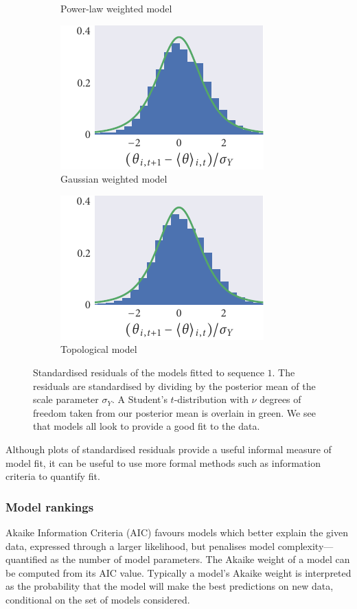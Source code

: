 \begin{figure}[tbb]
\begin{subfigure}[t]{0.33333\textwidth}
    \caption{Power-law weighted model}
  \end{subfigure}%
  \begin{subfigure}[t]{0.33333\textwidth}
    \includegraphics{seq1/gauss_residuals.pdf}
    \caption{Gaussian weighted model}
  \end{subfigure}%
  \begin{subfigure}[t]{0.33333\textwidth}
    \includegraphics{seq1/top_residuals.pdf}
    \caption{Topological model}
  \end{subfigure}
  \caption{Standardised residuals of the models fitted to sequence $1$. The
  residuals are standardised by dividing by the posterior mean of the scale
  parameter $\sigma_Y$. A Student's $t$-distribution with $\nu$ degrees of
  freedom taken from our posterior mean is overlain in green. We see that
  models all look to provide a good fit to the data.}
  \label{fig:residuals_seq1}
\end{figure}

Although plots of standardised residuals provide a useful informal measure of
model fit, it can be useful to use more formal methods such as information
criteria to quantify fit.

\subsubsection{Model rankings}

Akaike Information Criteria (AIC) favours models which better explain the
given data, expressed through a larger likelihood, but penalises model
complexity---quantified as the number of model parameters. The Akaike weight of
a model can be computed from its AIC value. Typically a model's Akaike weight is
interpreted as the probability that the model will make the best predictions on
new data, conditional on the set of models considered.

